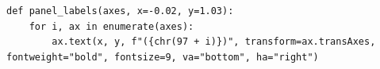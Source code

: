 \begin{lstlisting}[firstnumber=81]
def panel_labels(axes, x=-0.02, y=1.03):
    for i, ax in enumerate(axes):
        ax.text(x, y, f"({chr(97 + i)})", transform=ax.transAxes, fontweight="bold", fontsize=9, va="bottom", ha="right")
\end{lstlisting}
